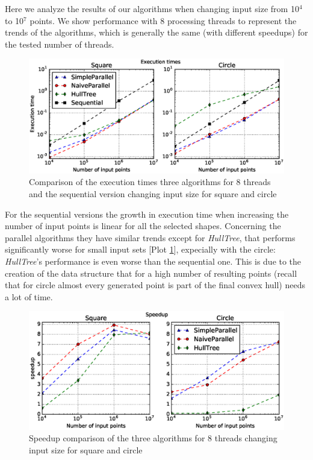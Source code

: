 \documentclass[letterpaper]{article}
\begin{document}
Here we analyze the results of our algorithms when changing input size from 10$^4$ to 10$^7$ points. We show performance with 8 processing threads to represent the trends of the algorithms, which is generally the same (with different speedups) for the tested number of threads.

\begin{figure}[!ht]\centering
  \includegraphics[scale=0.33]{./plots/time_points.eps}
  \caption{Comparison of the execution times three algorithms for 8 threads and the sequential version changing input size for square and circle\label{Input size time}}
\end{figure}

For the sequential versions the growth in execution time when increasing the number of input points is linear for all the selected shapes.
Concerning the parallel algorithms they have similar trends except for \textit{HullTree}, that performs significantly worse for small input sets [Plot \ref{Input size time}], expecially with the circle: \textit{HullTree}'s performance is even worse than the sequential one.
This is due to the creation of the data structure that for a high number of resulting points (recall that for circle almost every generated point is part of the final convex hull) needs a lot of time.

\begin{figure}[!ht]\centering
  \includegraphics[scale=0.33]{./plots/speedup_points.eps}
  \caption{Speedup comparison of the three algorithms for 8 threads changing input size for square and circle\label{Input size speedup}}
\end{figure}
\end{document}
